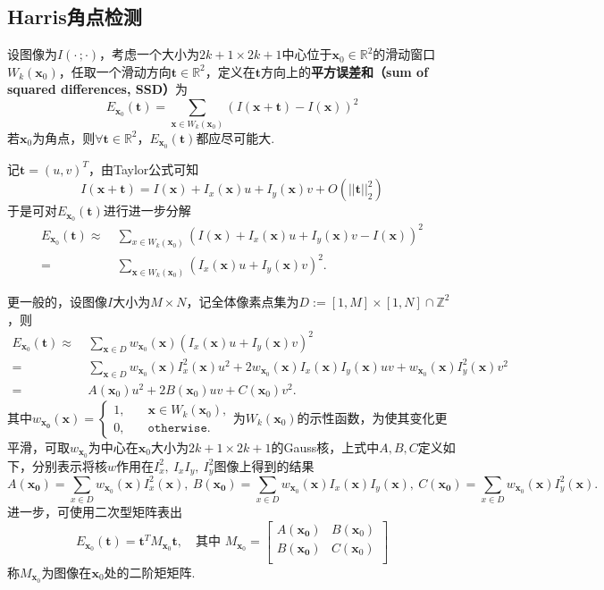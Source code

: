 \documentclass[12pt, a4paper, oneside]{ctexart}
\numberwithin{equation}{section}  %
\def\bd{\boldsymbol}        %
\def\R{\mathbb{R}}          %
\def\Z{\mathbb{Z}}          %
\def\add{\vspace{1ex}}      %
\begin{document}
\subsection{Harris角点检测}
设图像为$I(\cdot\, ;\cdot)$，考虑一个大小为$2k+1\times 2k+1$中心位于$\bd{x}_0\in\R^2$的滑动窗口$W_k(\bd{x}_0)$，任取一个滑动方向$\bd{t}\in\R^2$，定义在$\bd{t}$方向上的\textbf{平方误差和（sum of squared differences, SSD）}为
\begin{equation*}
    E_{\bd{x}_0}(\bd{t}) = \sum_{\bd{x}\in W_k(\bd{x}_0)}\left(I(\bd{x}+\bd{t})-I(\bd{x})\right)^2
\end{equation*}
若$\bd{x}_0$为角点，则$\forall \bd{t}\in\R^2$，$E_{\bd{x}_0}(\bd{t})$都应尽可能大.

记$\bd{t} = (u,v)^T$，由Taylor公式可知
\begin{equation*}
    I(\bd{x} + \bd{t}) = I(\bd{x}) + I_x(\bd{x})u+I_y(\bd{x})v+O(||\bd{t}||_2^2)
\end{equation*}
于是可对$E_{\bd{x}_0}(\bd{t})$进行进一步分解
\begin{align*}
    E_{\bd{x}_0}(\bd{t})\approx&\  \sum_{x\in W_k(\bd{x}_0)}\left(I(\bd{x}) + I_x(\bd{x})u+I_y(\bd{x})v-I(\bd{x})\right)^2\\
    =&\ \sum_{\bd{x}\in W_k(\bd{x}_0)}\left(I_x(\bd{x})u+I_y(\bd{x})v\right)^2.
\end{align*}

更一般的，设图像$I$大小为$M\times N$，记全体像素点集为$D:=[1,M]\times [1,N]\cap \Z^2$，则
\begin{align*}
    E_{\bd{x}_0}(\bd{t})\approx&\ \sum_{\bd{x}\in D}w_{\bd{x}_0}(\bd{x})\left(I_x(\bd{x})u+I_y(\bd{x})v\right)^2\\
    =&\ \sum_{\bd{x}\in D}w_{\bd{x}_0}(\bd{x})I_x^2(\bd{x})u^2+ 2w_{\bd{x}_0}(\bd{x})I_x(\bd{x})I_y(\bd{x})uv+w_{\bd{x}_0}(\bd{x})I_y^2(\bd{x})v^2\\
    =&\ A(\bd{x}_0)u^2+2B(\bd{x}_0)uv+C(\bd{x}_0)v^2.
\end{align*}
其中$w_{\bd{x_0}}(\bd{x}) = \begin{cases}
    1,&\quad \bd{x}\in W_k(\bd{x}_0),\\
    0,&\quad \texttt{otherwise}.
\end{cases}$为$W_k(\bd{x}_0)$的示性函数，\add 为使其变化更平滑，可取$w_{\bd{x}_0}$为中心在$\bd{x}_0$大小为$2k+1\times 2k+1$的Gauss核，上式中$A,B,C$定义如下，分别表示将核$w$作用在$I_x^2,\ I_xI_y,\ I_y^2$图像上得到的结果
\begin{equation*}
A(\bd{x_0}) = \sum_{x\in D}w_{\bd{x}_0}(\bd{x})I_x^2(\bd{x}),\ B(\bd{x_0}) = \sum_{x\in D}w_{\bd{x}_0}(\bd{x})I_x(\bd{x})I_y(\bd{x}),\ C(\bd{x_0}) = \sum_{x\in D}w_{\bd{x}_0}(\bd{x})I_y^2(\bd{x}).
\end{equation*}
进一步，可使用二次型矩阵表出
\begin{equation*}
    E_{\bd{x}_0}(\bd{t}) = \bd{t}^TM_{\bd{x}_0}\bd{t},\quad \text{其中 }M_{\bd{x}_0}=\left[\begin{matrix}
        A(\bd{x_0})&B(\bd{x}_0)\\
        B(\bd{x_0})&C(\bd{x}_0)\\
    \end{matrix}\right]
\end{equation*}
称$M_{\bd{x}_0}$为图像在$\bd{x}_0$处的二阶矩矩阵.
\end{document}
